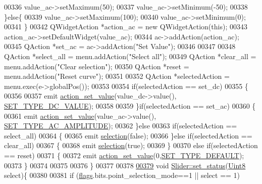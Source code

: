 \begin{DoxyCode}
00336     value\_ac->setMaximum(50);
00337     value\_ac->setMinimum(-50);
00338     \}\textcolor{keywordflow}{else}\{
00339     value\_ac->setMaximum(100);
00340     value\_ac->setMinimum(0);
00341     \}
00342     QWidgetAction *action\_ac = \textcolor{keyword}{new} QWidgetAction(\textcolor{keyword}{this});
00343     action\_ac->setDefaultWidget(value\_ac);
00344     ac->addAction(action\_ac);
00345     QAction *set\_ac = ac->addAction(\textcolor{stringliteral}{"Set Value"});
00346 
00347 
00348     QAction *select\_all = menu.addAction(\textcolor{stringliteral}{"Select all"});
00349     QAction *clear\_all = menu.addAction(\textcolor{stringliteral}{"Clear selection"});
00350     QAction *reset = menu.addAction(\textcolor{stringliteral}{"Reset curve"});
00351 
00352     QAction *selectedAction = menu.exec(e->globalPos());
00353 
00354     \textcolor{keywordflow}{if}(selectedAction == set\_dc)
00355     \{
00356 
00357         emit \hyperlink{a00024_a886f07f2c612121bec703581f9398a10}{action\_set\_value}(value\_dc->value(),
      \hyperlink{a00034_a347f6ec80828b93988d22989c0df015f}{SET\_TYPE\_DC\_VALUE});
00358 
00359     \}\textcolor{keywordflow}{if}(selectedAction == set\_ac)
00360     \{
00361          emit \hyperlink{a00024_a886f07f2c612121bec703581f9398a10}{action\_set\_value}(value\_ac->value(),
      \hyperlink{a00034_a704f34d2cc6c149f96e9da9d2a1aa8c0}{SET\_TYPE\_AC\_AMPLITUDE});
00362     \}\textcolor{keywordflow}{else}
00363     \textcolor{keywordflow}{if}(selectedAction == select\_all)
00364     \{
00365          emit \hyperlink{a00024_a66bf875d43a16cf37527ab75c439fd8e}{selection}(\textcolor{keyword}{false});
00366     \}\textcolor{keywordflow}{else} \textcolor{keywordflow}{if}(selectedAction == clear\_all)
00367     \{
00368          emit \hyperlink{a00024_a66bf875d43a16cf37527ab75c439fd8e}{selection}(\textcolor{keyword}{true});
00369     \}
00370     \textcolor{keywordflow}{else} \textcolor{keywordflow}{if}(selectedAction == reset)
00371     \{
00372          emit \hyperlink{a00024_a886f07f2c612121bec703581f9398a10}{action\_set\_value}(0,\hyperlink{a00034_afd1036bf6329d2ac31913e14c1f56725}{SET\_TYPE\_DEFAULT});
00373     \}
00374 
00375 
00376 \}
00377 
00378 
\hypertarget{a00046_source_l00379}{}\hyperlink{a00024_a567902754e43310fe921b74c9d1862dd}{00379} \textcolor{keywordtype}{void} \hyperlink{a00024_a567902754e43310fe921b74c9d1862dd}{Slider::set\_status}(\hyperlink{a00001_a979e3e23b9a449e69ab6a8a83b6042f8}{Uint8} select)\{
00380 
00381     \textcolor{keywordflow}{if} (\hyperlink{a00024_ade6449558d429b66e5ed1381bc9b9060}{flags}.bits.point\_selection\_mode==1 || select == 1)

\end{DoxyCode}
